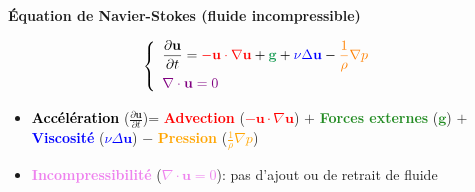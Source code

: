 \documentclass{beamer}
\begin{document}
\begin{frame}{}
\vspace{-1.5cm}

\begin{center}
    \textbf{Équation de Navier-Stokes (fluide incompressible)}
\end{center}

\vspace{-0.2cm}
\[
\left\{
\begin{array}{l}
    \displaystyle 
    \frac{\partial \mathbf{u}}{\partial t} = 
    \textcolor{red}{-\mathbf{u} \cdot \nabla \mathbf{u}} 
    + \textcolor{ForestGreen}{\mathbf{g}} 
    + \textcolor{blue}{\nu \Delta \mathbf{u}} 
    - \textcolor{orange}{\frac{1}{\rho} \nabla p} \\[2ex]
    \textcolor{violet}{\nabla \cdot \mathbf{u} = 0}
\end{array}
\right.
\]

\vspace{0.1cm}

\begin{itemize}
    \item \small \textbf{\textcolor{Black}{Accélération}} ($\frac{\partial \mathbf{u}}{\partial t} $)=
    \textbf{\textcolor{red}{Advection}} (\textcolor{red}{$-\mathbf{u} \cdot \nabla \mathbf{u}$}) 
    $+$ \textbf{\textcolor{ForestGreen}{Forces externes}} (\textcolor{ForestGreen}{$\mathbf{g}$}) 
    $+$ \textbf{\textcolor{blue}{Viscosité}} (\textcolor{blue}{$\nu \Delta \mathbf{u}$}) 
    $-$ \textbf{\textcolor{orange}{Pression}} (\textcolor{orange}{$\frac{1}{\rho} \nabla p$})
    \item \textbf{\textcolor{violet}{Incompressibilité}} (\textcolor{violet}{$\nabla \cdot \mathbf{u} = 0$}): pas d'ajout ou de retrait de fluide
\end{itemize}

\end{frame}
\end{document}
